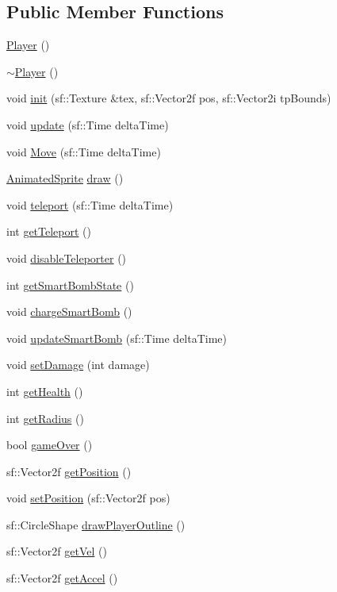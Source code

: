 \subsection*{Public Member Functions}
\begin{DoxyCompactItemize}
\item 
\hyperlink{class_player_affe0cc3cb714f6deb4e62f0c0d3f1fd8}{Player} ()
\item 
\hyperlink{class_player_a749d2c00e1fe0f5c2746f7505a58c062}{$\sim$\+Player} ()
\item 
void \hyperlink{class_player_ad088063876ac0e5c3eb59fc7c4806929}{init} (sf\+::\+Texture \&tex, sf\+::\+Vector2f pos, sf\+::\+Vector2i tp\+Bounds)
\item 
void \hyperlink{class_player_aeb1ca63f5401afa5d6aef2f308481672}{update} (sf\+::\+Time delta\+Time)
\item 
void \hyperlink{class_player_aab4ff61041f937e6c3d560863fa46f56}{Move} (sf\+::\+Time delta\+Time)
\item 
\hyperlink{class_animated_sprite}{Animated\+Sprite} \hyperlink{class_player_af9e361fd707a32d86ff1a0f75fb2c3b2}{draw} ()
\item 
void \hyperlink{class_player_ad975c53e4e2e21b597079e59c1ed0262}{teleport} (sf\+::\+Time delta\+Time)
\item 
int \hyperlink{class_player_a995b03fe2b8f0b47aa526c975a3b8254}{get\+Teleport} ()
\item 
void \hyperlink{class_player_a805a8d4ae2c5eddaee1ff7c716467f2c}{disable\+Teleporter} ()
\item 
int \hyperlink{class_player_a5aaef7be6b70ec6069a861add36b5e2c}{get\+Smart\+Bomb\+State} ()
\item 
void \hyperlink{class_player_a2c704d0bed9de1dc0b3512113f42bb97}{charge\+Smart\+Bomb} ()
\item 
void \hyperlink{class_player_a41a1a1a4f50f7a878ee22c92b42fd2b1}{update\+Smart\+Bomb} (sf\+::\+Time delta\+Time)
\item 
void \hyperlink{class_player_a065d28e46d0660eff17bad53f2efd622}{set\+Damage} (int damage)
\item 
int \hyperlink{class_player_abcb15d249bed9a4ab0ab86b52b0d747a}{get\+Health} ()
\item 
int \hyperlink{class_player_a96b2c2aa27ba5d756b12fddb2a841cc8}{get\+Radius} ()
\item 
bool \hyperlink{class_player_a98dff5ba148838f3db6d9934048c33d9}{game\+Over} ()
\item 
sf\+::\+Vector2f \hyperlink{class_player_a23356f99a9de86d3d47eadb679b332dc}{get\+Position} ()
\item 
void \hyperlink{class_player_a04a1bb340ea6d425fb2927c397e96e4e}{set\+Position} (sf\+::\+Vector2f pos)
\item 
sf\+::\+Circle\+Shape \hyperlink{class_player_ae47cf3c74c1e396d82c3266290871852}{draw\+Player\+Outline} ()
\item 
sf\+::\+Vector2f \hyperlink{class_player_a0ec9b337a29a388ca7ce6dc9de93ca76}{get\+Vel} ()
\item 
sf\+::\+Vector2f \hyperlink{class_player_acd90a76e6bf73c5a7d2ff168965c3467}{get\+Accel} ()
\end{DoxyCompactItemize}
